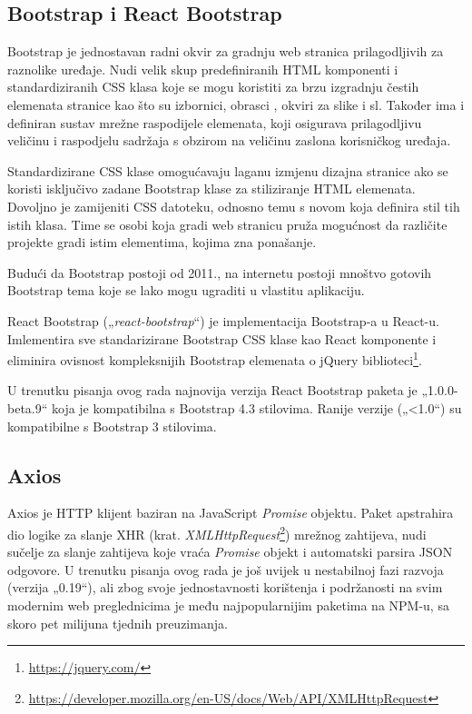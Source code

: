 \documentclass[times, utf8, diplomski, numeric]{fer}
\newcommand{\razmakp}{\vspace{18pt}}
\newcommand{\razmaks}{\vspace{10pt}}
\begin{document}
\newpage
\subsection{Bootstrap i React Bootstrap}

Bootstrap je jednostavan radni okvir za gradnju web stranica prilagodljivih za raznolike uređaje.
Nudi velik skup predefiniranih HTML komponenti i standardiziranih CSS klasa koje se mogu koristiti za brzu izgradnju čestih elemenata stranice kao što su izbornici, obrasci , okviri za slike i sl.
Također ima i definiran sustav mrežne raspodijele elemenata, koji osigurava prilagodljivu veličinu i raspodjelu sadržaja s obzirom na veličinu zaslona korisničkog uređaja.

Standardizirane CSS klase omogućavaju laganu izmjenu dizajna stranice ako se koristi isključivo zadane Bootstrap klase za stiliziranje HTML elemenata.
Dovoljno je zamijeniti CSS datoteku, odnosno temu s novom koja definira stil tih istih klasa.
Time se osobi koja gradi web stranicu pruža mogućnost da različite projekte gradi istim elementima, kojima zna ponašanje.

Budući da Bootstrap postoji od 2011.\citep{wiki_bs}, na internetu postoji mnoštvo gotovih Bootstrap tema koje se lako mogu ugraditi u vlastitu aplikaciju.

\razmakp

React Bootstrap („\emph{react-bootstrap}“) je implementacija Bootstrap-a u React-u.
Imlementira sve standarizirane Bootstrap CSS klase kao React komponente i eliminira ovisnost kompleksnijih Bootstrap elemenata o jQuery biblioteci\footnote{\url{https://jquery.com/}}.

U trenutku pisanja ovog rada najnovija verzija React Bootstrap paketa je „1.0.0-beta.9“ koja je kompatibilna s Bootstrap 4.3 stilovima.
Ranije verzije („<1.0“) su kompatibilne s Bootstrap 3 stilovima\citep{bs_react}.


\razmaks
\subsection{Axios}

Axios je HTTP klijent baziran na JavaScript \emph{Promise} objektu.
Paket apstrahira dio logike za slanje XHR (krat. \emph{XMLHttpRequest}\footnote{\url{https://developer.mozilla.org/en-US/docs/Web/API/XMLHttpRequest}}) mrežnog zahtijeva, nudi sučelje za slanje zahtijeva koje vraća \emph{Promise} objekt i automatski parsira JSON odgovore.
U trenutku pisanja ovog rada je još uvijek u nestabilnoj fazi razvoja (verzija „0.19“), ali zbog svoje jednostavnosti korištenja i podržanosti na svim modernim web preglednicima je među najpopularnijim paketima na NPM-u, sa skoro pet milijuna tjednih preuzimanja\citep{axios}.
\end{document}

